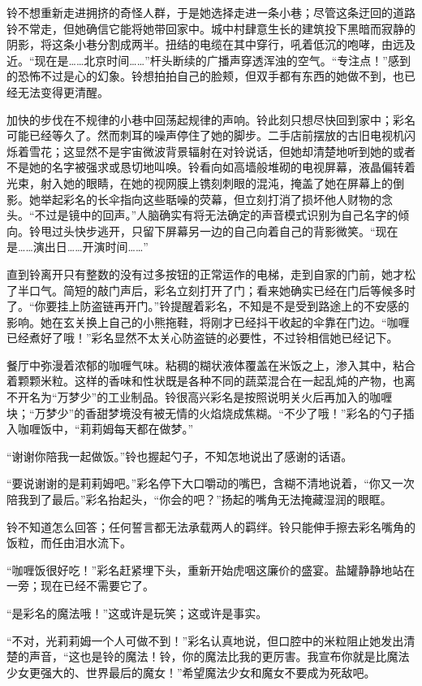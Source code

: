 铃不想重新走进拥挤的奇怪人群，于是她选择走进一条小巷；尽管这条迂回的道路铃不常走，但她确信它能将她带回家中。城中村肆意生长的建筑投下黑暗而寂静的阴影，将这条小巷分割成两半。扭结的电缆在其中穿行，吼着低沉的咆哮，由远及近。“现在是……北京时间……”杆头断续的广播声穿透浑浊的空气。“专注点！”感到的恐怖不过是心的幻象。铃想拍拍自己的脸颊，但双手都有东西的她做不到，也已经无法变得更清醒。

加快的步伐在不规律的小巷中回荡起规律的声响。铃此刻只想尽快回到家中；彩名可能已经等久了。然而刺耳的噪声停住了她的脚步。二手店前摆放的古旧电视机闪烁着雪花；这显然不是宇宙微波背景辐射在对铃说话，但她却清楚地听到她的或者不是她的名字被强求或恳切地叫唤。铃看向如高墙般堆砌的电视屏幕，液晶偏转着光束，射入她的眼睛，在她的视网膜上镌刻刺眼的混沌，掩盖了她在屏幕上的倒影。她举起彩名的长伞指向这些聒噪的荧幕，但立刻打消了损坏他人财物的念头。“不过是镜中的回声。”人脑确实有将无法确定的声音模式识别为自己名字的倾向。铃甩过头快步逃开，只留下屏幕另一边的自己向着自己的背影微笑。“现在是……演出日……开演时间……”

直到铃离开只有整数的没有过多按钮的正常运作的电梯，走到自家的门前，她才松了半口气。简短的敲门声后，彩名立刻打开了门；看来她确实已经在门后等候多时了。“你要挂上防盗链再开门。”铃提醒着彩名，不知是不是受到路途上的不安感的影响。她在玄关换上自己的小熊拖鞋，将刚才已经抖干收起的伞靠在门边。“咖喱已经煮好了哦！”彩名显然不太关心防盗链的必要性，不过铃相信她已经记下。

餐厅中弥漫着浓郁的咖喱气味。粘稠的糊状液体覆盖在米饭之上，渗入其中，粘合着颗颗米粒。这样的香味和性状既是各种不同的蔬菜混合在一起乱炖的产物，也离不开名为“万梦少”的工业制品。铃很高兴彩名是按照说明关火后再加入的咖喱块；“万梦少”的香甜梦境没有被无情的火焰烧成焦糊。“不少了哦！”彩名的勺子插入咖喱饭中，“莉莉姆每天都在做梦。”

“谢谢你陪我一起做饭。”铃也握起勺子，不知怎地说出了感谢的话语。

“要说谢谢的是莉莉姆吧。”彩名停下大口嚼动的嘴巴，含糊不清地说着，“你又一次陪我到了最后。”彩名抬起头，“你会的吧？”扬起的嘴角无法掩藏湿润的眼眶。

铃不知道怎么回答；任何誓言都无法承载两人的羁绊。铃只能伸手擦去彩名嘴角的饭粒，而任由泪水流下。

“咖喱饭很好吃！”彩名赶紧埋下头，重新开始虎咽这廉价的盛宴。盐罐静静地站在一旁；现在已经不需要它了。

“是彩名的魔法哦！”这或许是玩笑；这或许是事实。

“不对，光莉莉姆一个人可做不到！”彩名认真地说，但口腔中的米粒阻止她发出清楚的声音，“这也是铃的魔法！铃，你的魔法比我的更厉害。我宣布你就是比魔法少女更强大的、世界最后的魔女！”希望魔法少女和魔女不要成为死敌吧。

